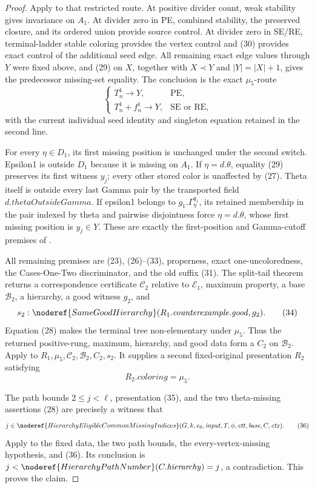 \begin{proof}
Apply  to that
restricted route.  At positive divider count, weak stability gives
invariance on $A_1$.  At divider zero in PE, combined stability, the
preserved closure, and its ordered union provide source control.  At
divider zero in SE/RE, terminal-ladder stable coloring provides the
vertex control and (30) provides exact control of the additional seed
edge.  All remaining exact edge values through $Y$ were fixed above,
and (29) on $X$, together with $X\prec Y$ and $|Y|=|X|+1$, gives the
predecessor missing-set equality.  The conclusion is the exact
$\mu _5$-route
\[
 \begin{cases}
 T_n^1\longrightarrow Y,&\text{PE},\\
 T_n^1+f_n^1\longrightarrow Y,&\text{SE or RE},
 \end{cases}                                                   \tag{33}
\]
with the current individual seed identity and singleton equation
retained in the second line.

For every $\eta\in D_1$, its first missing position is unchanged under
the second switch.  Epsilon1 is outside $D_1$ because it is missing on
$A_1$.  If $\eta=d.\theta$, equality (29) preserves its first witness
$y_j$; every other stored color is unaffected by (27).  Theta itself is
outside every last Gamma pair by the transported field
$d.\mathit{thetaOutsideGamma}$.  If epsilon1 belongs to
$g_1.\Gamma^{q_1}_\eta$, its retained membership in the pair indexed by
theta and pairwise disjointness force $\eta=d.\theta$, whose first
missing position is $y_j\in Y$.  These are exactly the first-position
and Gamma-cutoff premises of
.

All remaining premises are (23), (26)--(33), properness, exact
one-uncoloredness, the Cases-One-Two discriminator, and the old suffix
(31).  The split-tail theorem returns a correspondence certificate
$\mathcal C_2$ relative to $\mathcal E_1$, maximum property, a base
$\mathcal B_2$, a hierarchy, a good witness $g_2$, and
\[
 s_2:\noderef{SameGoodHierarchy}
        (R_1.\mathit{counterexample.good},g_2).                \tag{34}
\]
Equation (28) makes the terminal tree non-elementary under $\mu _5$.
Thus the returned positive-rung, maximum, hierarchy, and good data form
a  $C_2$ on $\mathcal B_2$.  Apply
 to
$R_1,\mu _5,\mathcal C_2,\mathcal B_2,C_2,s_2$.  It supplies a second
fixed-original presentation $R_2$ satisfying
\[
                         R_2.\mathit{coloring}=\mu _5.         \tag{35}
\]

The path bounds $2\le j<\ell$, presentation (35), and the two
theta-missing assertions (28) are precisely a witness that
\[
 j\in\noderef{HierarchyEligibleCommonMissingIndices}
   (G,k,e_0,\mathit{input},T,\phi,\mathit{ett},\mathit{base},C,
    \mathit{ctx}).                                             \tag{36}
\]
Apply  to the fixed
data, the two path bounds, the every-vertex-missing hypothesis, and
(36).  Its conclusion is
$j<\noderef{HierarchyPathNumber}(C.\mathit{hierarchy})=j$, a
contradiction.  This proves the claim.
\end{proof}
